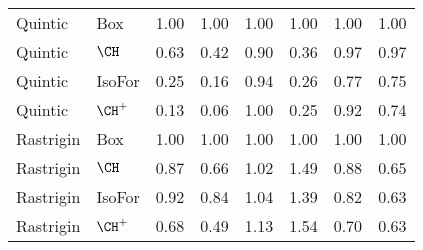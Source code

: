 \begin{table}[ht]
\begin{tabular}{llllllll}
  Quintic & {\sc Box} & 1.00 & 1.00 & 1.00 & 1.00 & 1.00 & 1.00 \\ 
  Quintic & $\CH$ & 0.63 & 0.42 & 0.90 & 0.36 & 0.97 & 0.97 \\ 
  Quintic & {\sc IsoFor} & 0.25 & 0.16 & 0.94 & 0.26 & 0.77 & 0.75 \\ 
  Quintic & $\CH^+$ & 0.13 & 0.06 & 1.00 & 0.25 & 0.92 & 0.74 \\ 
  Rastrigin & {\sc Box} & 1.00 & 1.00 & 1.00 & 1.00 & 1.00 & 1.00 \\ 
  Rastrigin & $\CH$ & 0.87 & 0.66 & 1.02 & 1.49 & 0.88 & 0.65 \\ 
  Rastrigin & {\sc IsoFor} & 0.92 & 0.84 & 1.04 & 1.39 & 0.82 & 0.63 \\ 
  Rastrigin & $\CH^+$ & 0.68 & 0.49 & 1.13 & 1.54 & 0.70 & 0.63 \\ 
   \hline
\end{tabular}
\end{table}
